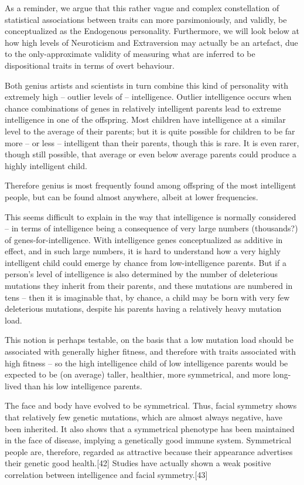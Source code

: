\documentclass[
]{book}
\begin{document}
As a reminder, we argue that this rather vague and complex constellation of statistical associations between traits can more parsimoniously, and validly, be conceptualized as the Endogenous personality. Furthermore, we will look below at how high levels of Neuroticism and Extraversion may actually be an artefact, due to the only-approximate validity of measuring what are inferred to be dispositional traits in terms of overt behaviour.

Both genius artists and scientists in turn combine this kind of personality with extremely high -- outlier levels of -- intelligence. Outlier intelligence occurs when chance combinations of genes in relatively intelligent parents lead to extreme intelligence in one of the offspring. Most children have intelligence at a similar level to the average of their parents; but it is quite possible for children to be far more -- or less -- intelligent than their parents, though this is rare. It is even rarer, though still possible, that average or even below average parents could produce a highly intelligent child.

Therefore genius is most frequently found among offspring of the most intelligent people, but can be found almost anywhere, albeit at lower frequencies.

This seems difficult to explain in the way that intelligence is normally considered -- in terms of intelligence being a consequence of very large numbers (thousands?) of genes-for-intelligence. With intelligence genes conceptualized as additive in effect, and in such large numbers, it is hard to understand how a very highly intelligent child could emerge by chance from low-intelligence parents. But if a person's level of intelligence is also determined by the number of deleterious mutations they inherit from their parents, and these mutations are numbered in tens -- then it is imaginable that, by chance, a child may be born with very few deleterious mutations, despite his parents having a relatively heavy mutation load.

This notion is perhaps testable, on the basis that a low mutation load should be associated with generally higher fitness, and therefore with traits associated with high fitness -- so the high intelligence child of low intelligence parents would be expected to be (on average) taller, healthier, more symmetrical, and more long-lived than his low intelligence parents.

The face and body have evolved to be symmetrical. Thus, facial symmetry shows that relatively few genetic mutations, which are almost always negative, have been inherited. It also shows that a symmetrical phenotype has been maintained in the face of disease, implying a genetically good immune system. Symmetrical people are, therefore, regarded as attractive because their appearance advertises their genetic good health.{[}42{]} Studies have actually shown a weak positive correlation between intelligence and facial symmetry.{[}43{]}
\end{document}
